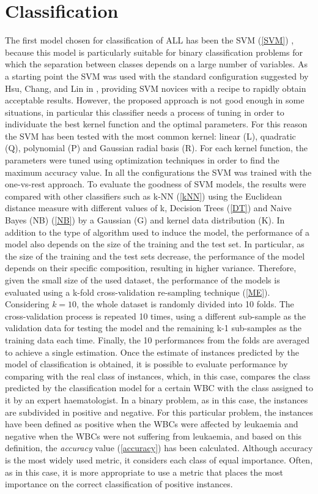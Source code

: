 \documentclass[final,a4paper,12pt,english]{UnicaPhdThesis3}
\begin{document}
\section{Classification}
The first model chosen for classification of ALL has been the SVM (\ref{SVM}) \cite{Put13b}, because this model is particularly suitable for binary classification problems for which the separation between classes depends on a large number of variables. As a starting point the SVM was used with the standard configuration suggested by Hsu, Chang, and Lin in \cite{Hsu}, providing SVM novices with a recipe to rapidly  obtain acceptable  results. However, the proposed approach is not good enough in some situations, in particular this classifier needs a process of tuning in order to individuate the best kernel function and the optimal parameters. For this reason  the SVM has been tested with  the  most  common  kernel:  linear  (L), quadratic  (Q), polynomial (P) and Gaussian radial basis (R). For each kernel function, the parameters were tuned using optimization techniques in order to find the maximum  accuracy value. In all the configurations the SVM was trained with the one-vs-rest approach. To  evaluate  the  goodness of SVM models, the results were compared with other classifiers such as k-NN (\ref{kNN}) using the Euclidean distance measure with different values  of k, Decision Trees (\ref{DT}) and Naive Bayes (\acs{NB}) (\ref{NB}) by  a Gaussian  (G)  and kernel data distribution (K). In addition to the type of algorithm  used to induce the model, the performance  of a model also depends on the  size of the  training  and the  test  set. In particular, as the size of the  training  and  the  test  sets decrease,  the  performance of the  model depends on their  specific composition, resulting in higher variance. Therefore, given the small size of the used dataset, the performance of the models is evaluated  using a k-fold cross-validation re-sampling technique (\ref{ME}).  Considering $k = 10$, the whole dataset is randomly divided into 10 folds. The cross-validation process is repeated 10 times, using a different sub-sample  as the validation data for testing the model and the remaining k-1 sub-samples as the training data each time. Finally,  the 10 performances  from the folds are averaged  to achieve a single estimation. Once the estimate  of instances  predicted  by the model of classification is obtained, it is possible to evaluate performance by comparing with the real class of instances,  which, in this case, compares the class predicted  by the classification model for a certain WBC with the class assigned to it by an expert haematologist.  In a binary problem, as in this case, the instances are subdivided in positive and negative. For this particular problem, the instances have been defined as positive when the WBCs were affected by leukaemia and negative when the WBCs were not suffering from leukaemia, and based on this definition, the \textit{accuracy} value (\ref{accuracy}) has been calculated. Although accuracy is the most widely used metric, it considers each class of equal importance. Often, as in this case, it is more appropriate to use a metric that places the most importance on the correct  classification of positive instances. 
\end{document}
